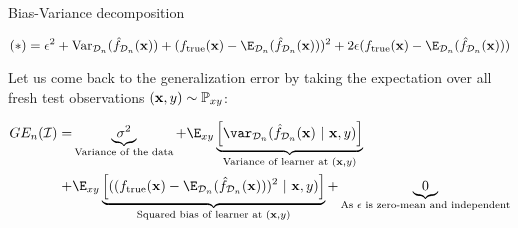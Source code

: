 \documentclass[11pt,compress,t,notes=noshow, xcolor=table]{beamer}
\begin{document}
\begin{frame2}[footnotesize]{Bias-Variance decomposition}

$$
(*) = \epsilon^2 + \text{Var}_{\D_n}(\fh_{\D_n}(\xv)) + 
  (\ftrue(\xv) - \E_{\D_n}(\fh_{\D_n}(\xv)))^2
 +2 \epsilon (\ftrue(\xv) - \E_{\D_n}(\fh_{\D_n}(\xv)))
$$

\vfill 

Let us come back to the generalization error by taking the expectation over all fresh test observations $(\mathbf{x}, y) \sim \mathbb{P}_{xy}$: 
\vfill

\begin{align*}
GE_n(\ind) 
=& \underbrace{\sigma^2}_{\text{Variance of the data}} + \E_{xy}\underbrace{\left[\var_{\D_n}(\fh_{\D_n}(\xv) ~|~\xv, y)\right]}_{\text{Variance of learner at } (\xv, y)} \\ 
+& \E_{xy}\underbrace{\left[((\ftrue(\xv)-\E_{\D_n}(\fh_{\D_n}(\xv)))^2~|~\xv, y)\right]}_{\text{Squared bias of learner at } (\xv, y)} + \underbrace{0}_{\text{As $\epsilon$ is zero-mean and independent}}
\end{align*}



\end{frame2}



\endlecture
\end{document}
